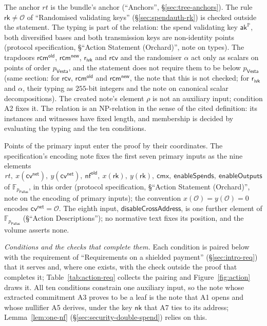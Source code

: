 \documentclass[11pt,a4paper]{article}
\theoremstyle{definition}
\newcommand{\F}{\mathbb{F}}
\newcommand{\PP}{\mathbb{P}}
\newcommand{\nfsym}{\mathsf{nf}}
\newcommand{\cmx}{\mathsf{cmx}}
\newcommand{\cvsym}{\mathsf{cv}}
\newcommand{\rk}{\mathsf{rk}}
\newcommand{\Pallas}{\ensuremath{\mathsf{Pallas}}}
\newcommand{\Vesta}{\ensuremath{\mathsf{Vesta}}}
\newcommand{\aksym}{\ensuremath{\mathsf{ak}}}
\newcommand{\nksym}{\ensuremath{\mathsf{nk}}}
\newcommand{\rcv}{\ensuremath{\mathsf{rcv}}}
\newcommand{\rcm}{\ensuremath{\mathsf{rcm}}}
\newcommand{\rivk}{\ensuremath{\mathsf{r_{ivk}}}}
\begin{document}
The anchor $\mathit{rt}$ is the bundle's anchor (``Anchors'',
\S\ref{sec:tree-anchors}). The rule $\rk \neq \mathcal{O}$ of ``Randomised
validating keys'' (\S\ref{sec:spendauth-rk}) is checked outside the
statement. The typing is part of the relation: the spend validating key
$\aksym^{\PP}$, both diversified bases and both transmission keys are
non-identity points (protocol specification, \S``Action Statement
(Orchard)'', note on types). The trapdoors $\rcm^{\mathsf{old}}$,
$\rcm^{\mathsf{new}}$, $\rivk$ and $\rcv$ and the randomiser $\alpha$ act only
as scalars on points of order $p_{\Vesta}$, and the statement does not
require them to be below $p_{\Vesta}$ (same section: for $\rcv$,
$\rcm^{\mathsf{old}}$ and $\rcm^{\mathsf{new}}$, the note that this is not
checked; for $\rivk$ and $\alpha$, their typing as $255$-bit integers and
the note on canonical scalar decompositions). The created note's element
$\rho$ is not an auxiliary input; condition A2 fixes it. The relation is an
NP-relation in the sense of the cited definition: its instances and
witnesses have fixed length, and membership is decided by evaluating the
typing and the ten conditions.

Points of the primary input enter the proof by their coordinates. The
specification's encoding note fixes the first seven primary inputs as the
nine elements
\[
  \mathit{rt},\ x(\cvsym^{\mathsf{net}}),\ y(\cvsym^{\mathsf{net}}),\
  \nfsym^{\mathsf{old}},\ x(\rk),\ y(\rk),\ \cmx,\ \mathsf{enableSpends},\
  \mathsf{enableOutputs}
\]
of $\F_{p_{\Pallas}}$, in this order (protocol specification, \S``Action
Statement (Orchard)'', note on the encoding of primary inputs); the
convention $x(\mathcal{O}) = y(\mathcal{O}) = 0$ encodes
$\cvsym^{\mathsf{net}} = \mathcal{O}$. The eighth input,
$\mathsf{disableCrossAddress}$, is one further element of
$\F_{p_{\Pallas}}$ (\S``Action Descriptions''); no normative text fixes its
position, and the volume asserts none.

\emph{Conditions and the checks that complete them.} Each condition is paired
below with the requirement of ``Requirements on a shielded payment''
(\S\ref{sec:intro-req}) that it serves and, where one exists, with the check
outside the proof that completes it; Table~\ref{tab:action-req} collects the
pairing and Figure~\ref{fig:action} draws it. All ten conditions constrain
one auxiliary input, so the note whose extracted commitment A3 proves to be
a leaf is the note that A1 opens and whose nullifier A5 derives, under the key
$\nksym$ that A7 ties to its address; Lemma~\ref{lem:one-nf}
(\S\ref{sec:security-double-spend}) relies on this.
\end{document}
